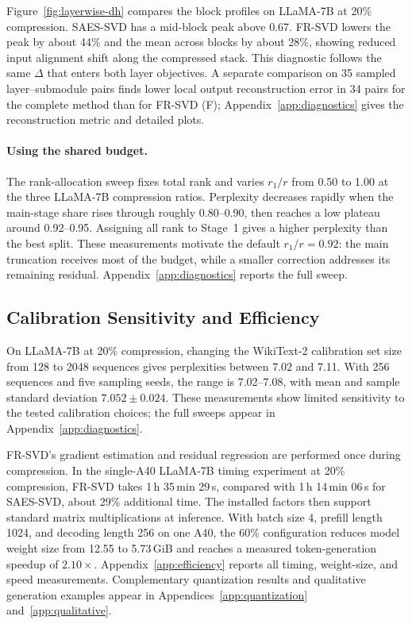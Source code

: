 \documentclass[11pt]{article}
\begin{document}


Figure~\ref{fig:layerwise-dh} compares the block profiles on LLaMA-7B at 20\% compression. SAES-SVD has a mid-block peak above 0.67. FR-SVD lowers the peak by about 44\% and the mean across blocks by about 28\%, showing reduced input alignment shift along the compressed stack. This diagnostic follows the same $\Delta$ that enters both layer objectives. A separate comparison on 35 sampled layer--submodule pairs finds lower local output reconstruction error in 34 pairs for the complete method than for FR-SVD (F); Appendix~\ref{app:diagnostics} gives the reconstruction metric and detailed plots.

\paragraph{Using the shared budget.}
The rank-allocation sweep fixes total rank and varies $r_1/r$ from 0.50 to 1.00 at the three LLaMA-7B compression ratios. Perplexity decreases rapidly when the main-stage share rises through roughly 0.80--0.90, then reaches a low plateau around 0.92--0.95. Assigning all rank to Stage~1 gives a higher perplexity than the best split. These measurements motivate the default $r_1/r=0.92$: the main truncation receives most of the budget, while a smaller correction addresses its remaining residual. Appendix~\ref{app:diagnostics} reports the full sweep.

\subsection{Calibration Sensitivity and Efficiency}

On LLaMA-7B at 20\% compression, changing the WikiText-2 calibration set size from 128 to 2048 sequences gives perplexities between 7.02 and 7.11. With 256 sequences and five sampling seeds, the range is 7.02--7.08, with mean and sample standard deviation $7.052\pm0.024$. These measurements show limited sensitivity to the tested calibration choices; the full sweeps appear in Appendix~\ref{app:diagnostics}.

FR-SVD's gradient estimation and residual regression are performed once during compression. In the single-A40 LLaMA-7B timing experiment at 20\% compression, FR-SVD takes 1\,h 35\,min 29\,s, compared with 1\,h 14\,min 06\,s for SAES-SVD, about 29\% additional time. The installed factors then support standard matrix multiplications at inference. With batch size 4, prefill length 1024, and decoding length 256 on one A40, the 60\% configuration reduces model weight size from 12.55 to 5.73\,GiB and reaches a measured token-generation speedup of $2.10\times$. Appendix~\ref{app:efficiency} reports all timing, weight-size, and speed measurements. Complementary quantization results and qualitative generation examples appear in Appendices~\ref{app:quantization} and~\ref{app:qualitative}.
\end{document}
